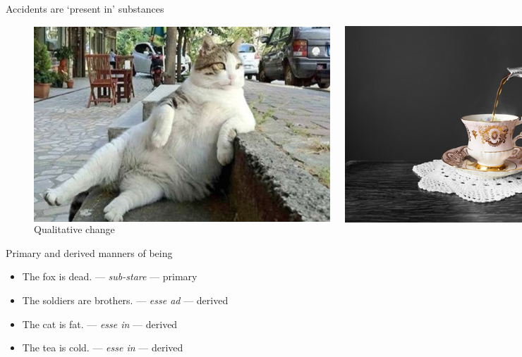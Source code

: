 \documentclass[xcolor=dvipsnames]{beamer}
\begin{document}
\begin{frame}{Accidents are `present in' substances}
\begin{figure}
  \centering
  \begin{columns}
    \centering
    \caption {Quantitative change}
    \includegraphics[width=0.99\textwidth]{cat}
    \centering
    \caption {Qualitative change}
    \includegraphics[width=0.99\textwidth]{tea}
  \end{columns}
\end{figure}
\end{frame}

\begin{frame}[fragile]{Primary and derived manners of being}
  \begin{itemize}
  \item The fox is dead. --- \emph{sub-stare} --- primary \vspace{5mm}
  \item The soldiers are brothers. --- \emph{esse ad} --- derived \vspace{5mm}
  \item The cat is fat. --- \emph{esse in} --- derived \vspace{5mm}
  \item The tea is cold. --- \emph{esse in} --- derived \vspace{5mm}
  \end{itemize}
\end{frame}
\end{document}
